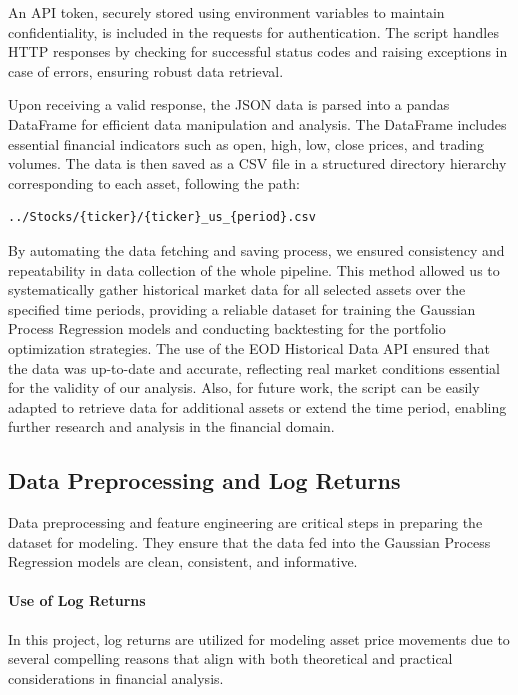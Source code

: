 An API token, securely stored using environment variables to maintain confidentiality, is included in the requests for authentication. The script handles HTTP responses by checking for successful status codes and raising exceptions in case of errors, ensuring robust data retrieval.

Upon receiving a valid response, the JSON data is parsed into a pandas DataFrame for efficient data manipulation and analysis. The DataFrame includes essential financial indicators such as open, high, low, close prices, and trading volumes. The data is then saved as a CSV file in a structured directory hierarchy corresponding to each asset, following the path:

\begin{verbatim}
../Stocks/{ticker}/{ticker}_us_{period}.csv
\end{verbatim}

By automating the data fetching and saving process, we ensured consistency and repeatability in data collection of the whole pipeline. 
This method allowed us to systematically gather historical market data for all selected assets over the specified time periods, providing a reliable dataset for training the Gaussian Process Regression models and conducting backtesting for the portfolio optimization strategies. 
The use of the EOD Historical Data API ensured that the data was up-to-date and accurate, reflecting real market conditions essential for the validity of our analysis.
Also, for future work, the script can be easily adapted to retrieve data for additional assets or extend the time period, enabling further research and analysis in the financial domain.

\subsection{Data Preprocessing and Log Returns}
Data preprocessing and feature engineering are critical steps in preparing the dataset for modeling. They ensure that the data fed into the Gaussian Process Regression models are clean, consistent, and informative.

\paragraph{Use of Log Returns}

In this project, log returns are utilized for modeling asset price movements due to several compelling reasons that align with both theoretical and practical considerations in financial analysis.

